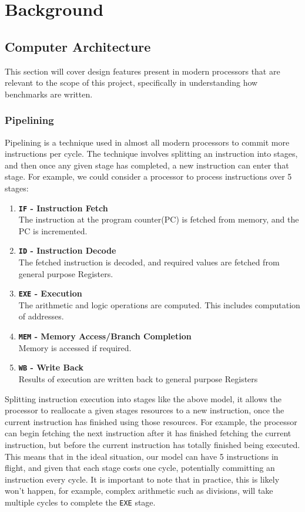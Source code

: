 \documentclass[bsc,frontabs,twoside,singlespacing,parskip,deptreport]{infthesis}     %
\begin{document}
\chapter{Background}\label{chap:bground}
\section{Computer Architecture}
This section will cover design features present in modern processors that are relevant to the scope of this project, specifically in understanding how benchmarks are written.

\subsection{Pipelining}
Pipelining is a technique used in almost all modern processors to commit more instructions per cycle. The technique involves splitting an instruction into stages, and then once any given stage has completed, a new instruction can enter that stage. For example, we could consider a processor to process instructions over 5 stages:
\begin{enumerate}
    \item{{\bf \texttt{IF} - Instruction Fetch} \\ The instruction at the program counter(PC) is fetched from memory, and the PC is incremented.}
    \item{{\bf \texttt{ID} - Instruction Decode} \\ The fetched instruction is decoded, and required values are fetched from general purpose Registers.}
    \item{{\bf \texttt{EXE} - Execution} \\ The arithmetic and logic operations are computed. This includes computation of addresses. }
    \item{{\bf \texttt{MEM} - Memory Access/Branch Completion} \\ Memory is accessed if required.}
    \item{{\bf \texttt{WB} - Write Back} \\ Results of execution are written back to general purpose Registers}
\end{enumerate}
Splitting instruction execution into stages like the above model, it allows the processor to reallocate a given stages resources to a new instruction, once the current instruction has finished using those resources. For example, the processor can begin fetching the next instruction after it has finished fetching the current instruction, but before the current instruction has totally finished being executed. This means that in the ideal situation, our model can have 5 instructions in flight, and given that each stage costs one cycle, potentially committing an instruction every cycle. It is important to note that in practice, this is likely won't happen, for example, complex arithmetic such as divisions, will take multiple cycles to complete the \texttt{EXE} stage.
\end{document}
